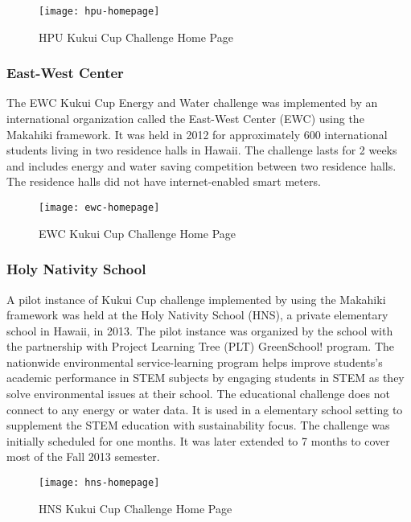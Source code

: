 \begin{figure}[ht!]
   \centering
   \texttt{[image: hpu-homepage]}
   \caption{HPU Kukui Cup Challenge Home Page}
   \label{fig:hpu-homepage}
\end{figure}

\subsubsection{East-West Center}

The EWC Kukui Cup Energy and Water challenge was implemented by an international organization called the East-West Center (EWC) using the Makahiki framework. It was held in 2012 for approximately 600 international students living in two residence halls in Hawaii. The challenge lasts for 2 weeks and includes energy and water saving competition between two residence halls. The residence halls did not have internet-enabled smart meters.

\begin{figure}[ht!]
   \centering
   \texttt{[image: ewc-homepage]}
   \caption{EWC Kukui Cup Challenge Home Page}
   \label{fig:ewc-homepage}
\end{figure}

\subsubsection{Holy Nativity School}

A pilot instance of Kukui Cup challenge implemented by using the Makahiki framework was held at the Holy Nativity School (HNS), a private elementary school in Hawaii, in 2013. The pilot instance was organized by the school with the partnership with Project Learning Tree (PLT) GreenSchool! program\cite{plt-greenschools}. The nationwide environmental service-learning program helps improve students's academic performance in STEM subjects by engaging students in STEM as they solve environmental issues at their school. The educational challenge does not connect to any energy or water data. It is used in a elementary school setting to supplement the STEM education with sustainability focus. The challenge was initially scheduled for one months. It was later extended to 7 months to cover most of the Fall 2013 semester.

\begin{figure}[ht!]
   \centering
   \texttt{[image: hns-homepage]}
   \caption{HNS Kukui Cup Challenge Home Page}
   \label{fig:hns-homepage}
\end{figure}

